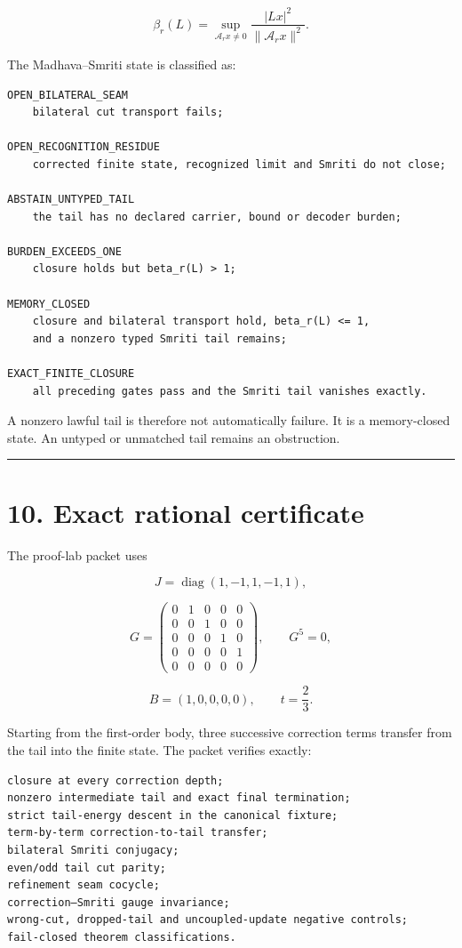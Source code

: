 \[
\beta_r(L)
=
\sup_{\mathcal A_rx\ne0}
\frac{|Lx|^2}{\|\mathcal A_rx\|^2}.
\tag{9.1}
\]

The Madhava--Smriti state is classified as:

\begin{verbatim}
OPEN_BILATERAL_SEAM
    bilateral cut transport fails;

OPEN_RECOGNITION_RESIDUE
    corrected finite state, recognized limit and Smriti do not close;

ABSTAIN_UNTYPED_TAIL
    the tail has no declared carrier, bound or decoder burden;

BURDEN_EXCEEDS_ONE
    closure holds but beta_r(L) > 1;

MEMORY_CLOSED
    closure and bilateral transport hold, beta_r(L) <= 1,
    and a nonzero typed Smriti tail remains;

EXACT_FINITE_CLOSURE
    all preceding gates pass and the Smriti tail vanishes exactly.
\end{verbatim}

A nonzero lawful tail is therefore not automatically failure. It is a
memory-closed state. An untyped or unmatched tail remains an obstruction.

\begin{center}\rule{0.5\linewidth}{0.5pt}\end{center}

\hypertarget{exact-rational-certificate}{%
\section{10. Exact rational certificate}\label{exact-rational-certificate}}

The proof-lab packet uses

\[
J=\operatorname{diag}(1,-1,1,-1,1),
\]

\[
G=
\begin{pmatrix}
0&1&0&0&0\\
0&0&1&0&0\\
0&0&0&1&0\\
0&0&0&0&1\\
0&0&0&0&0
\end{pmatrix},
\qquad G^5=0,
\]

\[
B=(1,0,0,0,0),
\qquad t=\frac23.
\]

Starting from the first-order body, three successive correction terms transfer
from the tail into the finite state. The packet verifies exactly:

\begin{verbatim}
closure at every correction depth;
nonzero intermediate tail and exact final termination;
strict tail-energy descent in the canonical fixture;
term-by-term correction-to-tail transfer;
bilateral Smriti conjugacy;
even/odd tail cut parity;
refinement seam cocycle;
correction–Smriti gauge invariance;
wrong-cut, dropped-tail and uncoupled-update negative controls;
fail-closed theorem classifications.
\end{verbatim}

